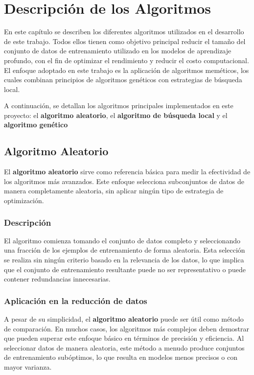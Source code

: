
\chapter{Descripción de los Algoritmos}\label{ch:descripcion-algoritmos}
En este capítulo se describen los diferentes algoritmos utilizados en el desarrollo de este trabajo.
Todos ellos tienen como objetivo principal reducir el tamaño del conjunto de datos de entrenamiento utilizado en los
modelos de aprendizaje profundo, con el fin de optimizar el rendimiento y reducir el costo computacional.
El enfoque adoptado en este trabajo es la aplicación de algoritmos meméticos, los cuales combinan principios de
algoritmos genéticos con estrategias de búsqueda local.


A continuación, se detallan los algoritmos principales implementados en este proyecto: el \textbf{algoritmo aleatorio},
el \textbf{algoritmo de búsqueda local} y el \textbf{algoritmo genético}

\section{Algoritmo Aleatorio}\label{sec:algoritmo-aleatorio}
El \textbf{algoritmo aleatorio} sirve como referencia básica para medir la efectividad de los algoritmos más avanzados.
Este enfoque selecciona subconjuntos de datos de manera completamente aleatoria, sin aplicar ningún tipo de estrategia
de optimización.

\subsection{Descripción}\label{subsec:descripcion}
El algoritmo comienza tomando el conjunto de datos completo y seleccionando una fracción de los ejemplos de
entrenamiento de forma aleatoria.
Esta selección se realiza sin ningún criterio basado en la relevancia de los datos, lo que implica que el conjunto de
entrenamiento resultante puede no ser representativo o puede contener redundancias innecesarias.

\subsection{Aplicación en la reducción de datos}\label{subsec:aplicacion-en-la-reduccion-de-datos}
A pesar de su simplicidad, el \textbf{algoritmo aleatorio} puede ser útil como método de comparación.
En muchos casos, los algoritmos más complejos deben demostrar que pueden superar este enfoque básico en términos de
precisión y eficiencia.
Al seleccionar datos de manera aleatoria, este método a menudo produce conjuntos de entrenamiento subóptimos, lo que
resulta en modelos menos precisos o con mayor varianza.


